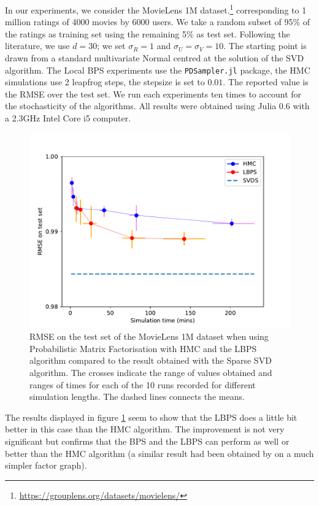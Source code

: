 In our experiments, we consider the MovieLens 1M dataset.\footnote{\url{https://grouplens.org/datasets/movielens/}} corresponding to 1 million ratings of 4000 movies by 6000 users. We take a random subset of 95\% of the ratings as training set using the remaining 5\% as test set. 
Following the literature, we use $d=30$; we set $\sigma_{R}=1$ and $\sigma_{U}=\sigma_{V}=10$. The starting point is drawn from a standard multivariate Normal centred at the solution of the SVD algorithm. The Local BPS experiments use the \texttt{PDSampler.jl} package, the HMC simulations use 2 leapfrog steps, the stepsize is set to $0.01$. The reported value is the RMSE over the test set. We run each experiments ten times to account for the stochasticity of the algorithms. All results were obtained using Julia 0.6 with a 2.3GHz Intel Core i5 computer. 

\begin{figure}
	\center
	\includegraphics[width=.8\textwidth]{figures/lbp/curves}
	\caption{\label{fig:LBPSvHMC}RMSE on the test set of the MovieLens 1M dataset when using Probabilistic Matrix Factorisation with HMC and the LBPS algorithm compared to the result obtained with the Sparse SVD algorithm. The crosses indicate the range of values obtained and ranges of times for each of the 10 runs recorded for different simulation lengths. The dashed lines connects the means.}
\end{figure}

The results displayed in figure \ref{fig:LBPSvHMC} seem to show that the LBPS does a little bit better in this case than the HMC algorithm. The improvement is not very significant but confirms that the BPS and the LBPS can perform as well or better than the HMC algorithm (a similar result had been obtained by \citep{bouchard15} on a much simpler factor graph). 

